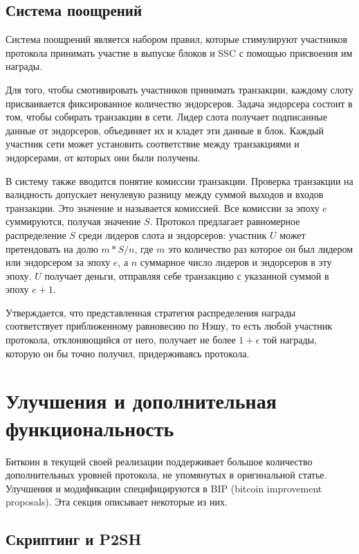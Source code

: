 \documentclass[specification,annotation]{itmo-student-thesis}
\begin{document}
\subsection{Система поощрений}

Система поощрений является набором правил, которые стимулируют
участников протокола принимать участие в выпуске блоков и SSC с
помощью присвоения им награды.

Для того, чтобы смотивировать участников принимать транзакции, каждому
слоту присваивается фиксированное количество эндорсеров. Задача
эндорсера состоит в том, чтобы собирать транзакции в сети. Лидер слота
получает подписанные данные от эндорсеров, объединяет их и кладет эти
данные в блок. Каждый участник сети может установить соответствие
между транзакциями и эндорсерами, от которых они были получены.

В систему также вводится понятие комиссии транзакции. Проверка
транзакции на валидность допускает ненулевую разницу между суммой
выходов и входов транзакции. Это значение и называется комиссией. Все
комиссии за эпоху $e$ суммируются, получая значение $S$. Протокол
предлагает равномерное распределение $S$ среди лидеров слота и
эндорсеров: участник $U$ может претендовать на долю $m * S / n$, где
$m$ это количество раз которое он был лидером или эндорсером за эпоху
$e$, а $n$ суммарное число лидеров и эндорсеров в эту эпоху. $U$
получает деньги, отправляя себе транзакцию с указанной суммой в эпоху
$e+1$.

Утверждается, что представленная стратегия распределения награды
соответствует приближенному равновесию по Нэшу, то есть любой участник
протокола, отклоняющийся от него, получает не более $1 + \epsilon$ той
награды, которую он бы точно получил, придерживаясь протокола.

\section{Улучшения и дополнительная функциональность}

Биткоин в текущей своей реализации поддерживает большое количество
дополнительных уровней протокола, не упомянутых в оригинальной
статье. Улучшения и модификации специфицируются в BIP (bitcoin
improvement proposals). Эта секция описывает некоторые из них.

\subsection{Скриптинг и P2SH}
\end{document}
